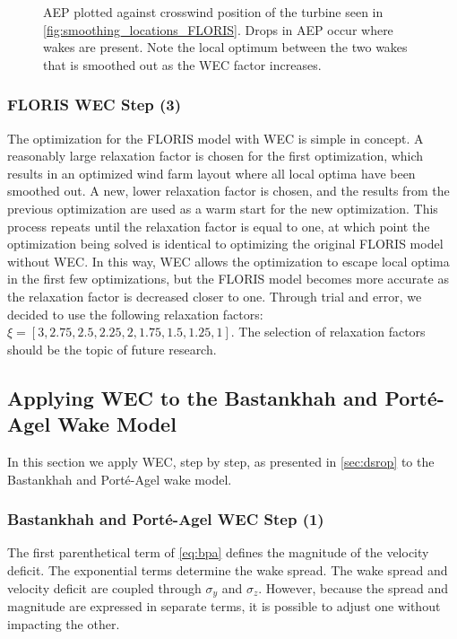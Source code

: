 \documentclass[a4paper]{jpconf}
\begin{document}
\begin{figure}[ht]
\begin{minipage}[t]{0.52\textwidth}
		\caption{AEP plotted against crosswind position of the turbine seen in \cref{fig:smoothing_locations_FLORIS}. Drops in AEP occur where wakes are present. Note the local optimum between the two wakes that is smoothed out as the WEC factor increases.}
		\label{fig:FLORISLocalOptSmoothed}
	\end{minipage}
\end{figure}

\subsubsection{FLORIS WEC Step (3)}

The optimization for the FLORIS model with WEC is simple in concept. A reasonably large relaxation factor is chosen for the first optimization, which results in an optimized wind farm layout where all local optima have been smoothed out. A new, lower relaxation factor is chosen, and the results from the previous optimization are used as a warm start for the new optimization. This process repeats until the relaxation factor is equal to one, at which point the optimization being solved is identical to optimizing the original FLORIS model without WEC. In this way, WEC allows the optimization to escape local optima in the first few optimizations, but the FLORIS model becomes more accurate as the relaxation factor is decreased closer to one. Through trial and error, we decided to use the following relaxation factors: $\xi = [3, 2.75, 2.5, 2.25, 2, 1.75, 1.5, 1.25, 1]$. The selection of relaxation factors should be the topic of future research.

\subsection{Applying WEC to the Bastankhah and Port\'e-Agel Wake Model}
In this section we apply WEC, step by step, as presented in \cref{sec:dsrop} to the Bastankhah and Port\'e-Agel wake model.  

\subsubsection{Bastankhah and Port\'e-Agel WEC Step (1)}
The first parenthetical term of \cref{eq:bpa} defines the magnitude of the velocity deficit. The exponential terms determine the wake spread. The wake spread and velocity deficit are coupled through $\sigma_y$ and $\sigma_z$. However, because the spread and magnitude are expressed in separate terms, it is possible to adjust one without impacting the other. 
\end{document}
